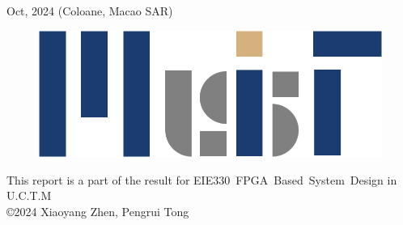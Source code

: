 \begin{titlepage}
    \vspace*{\fill}
		Oct, 2024\newline 
        (Coloane, Macao SAR)
        \vspace{0.7\baselineskip}\newline
        \begin{figure}[h]
            \includegraphics[width = 0.5\linewidth]{../../Report_Resources/MUIT_BlueGold.png}\par
        \end{figure}
        \FloatBarrier
        {\small This report is a part of the result for}
        {\small EIE330~FPGA~Based~System~Design in U.C.T.M}\\[0.25pt]
        {\small \copyright 2024 Xiaoyang Zhen, Pengrui Tong}

\end{titlepage}